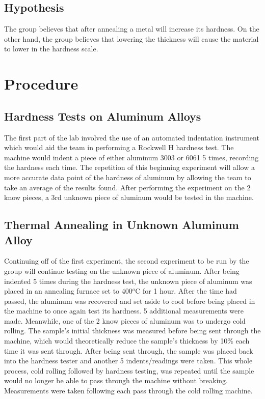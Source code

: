 \documentclass{article}
\begin{document}
\subsection{Hypothesis}
The group believes that after annealing a metal will increase its hardness. On the other hand, the group believes that lowering the thickness will cause the material to lower in the hardness scale. 

\section{Procedure}
\subsection {Hardness Tests on Aluminum Alloys}
\indent The first part of the lab involved the use of an automated indentation instrument which would aid the team in performing a Rockwell H hardness test. The machine would indent a piece of either aluminum 3003 or 6061 5 times, recording the hardness each time. The repetition of this beginning experiment will allow a more accurate data point of the hardness of aluminum by allowing the team to take an average of the results found. After performing the experiment on the 2 know pieces, a 3rd unknown piece of aluminum would be tested in the machine.

\subsection{Thermal Annealing in Unknown Aluminum Alloy}
\indent Continuing off of the first experiment, the second experiment to be run by the group will continue testing on the unknown piece of aluminum. After being indented 5 times during the hardness test, the unknown piece of aluminum was placed in an annealing furnace set to 400$^o$C for 1 hour. After the time had passed, the aluminum was recovered and set aside to cool before being placed in the machine to once again test its hardness. 5 additional measurements were made. Meanwhile, one of the 2 know pieces of aluminum was to undergo cold rolling. The sample’s initial thickness was measured before being sent through the machine, which would theoretically reduce the sample’s thickness by 10\% each time it was sent through. After being sent through, the sample was placed back into the hardness tester and another 5 indents/readings were taken. This whole process, cold rolling followed by hardness testing, was repeated until the sample would no longer be able to pass through the machine without breaking. Measurements were taken following each pass through the cold rolling machine.
	
\end{document}

